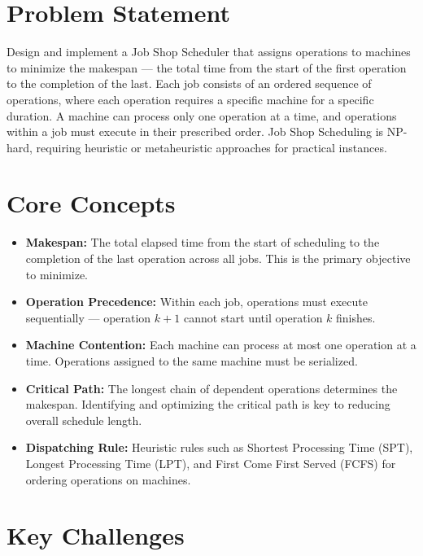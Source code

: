 \section{Problem Statement}

Design and implement a Job Shop Scheduler that assigns operations to machines to minimize the makespan --- the total time from the start of the first operation to the completion of the last. Each job consists of an ordered sequence of operations, where each operation requires a specific machine for a specific duration. A machine can process only one operation at a time, and operations within a job must execute in their prescribed order. Job Shop Scheduling is NP-hard, requiring heuristic or metaheuristic approaches for practical instances.

\section{Core Concepts}

\begin{itemize}
  \item \textbf{Makespan:} The total elapsed time from the start of scheduling to the completion of the last operation across all jobs. This is the primary objective to minimize.
  \item \textbf{Operation Precedence:} Within each job, operations must execute sequentially --- operation $k+1$ cannot start until operation $k$ finishes.
  \item \textbf{Machine Contention:} Each machine can process at most one operation at a time. Operations assigned to the same machine must be serialized.
  \item \textbf{Critical Path:} The longest chain of dependent operations determines the makespan. Identifying and optimizing the critical path is key to reducing overall schedule length.
  \item \textbf{Dispatching Rule:} Heuristic rules such as Shortest Processing Time (SPT), Longest Processing Time (LPT), and First Come First Served (FCFS) for ordering operations on machines.
\end{itemize}

\section{Key Challenges}

